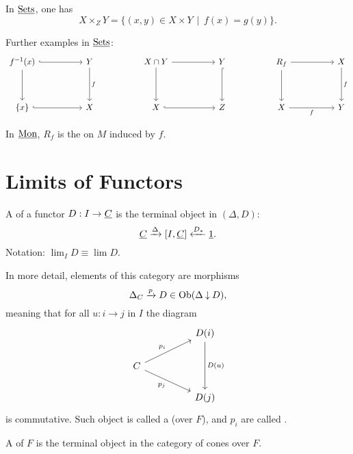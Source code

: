 \begin{examples*}
	\item In \( \underline{\mathrm{Sets}} \), one has
		\[
			X \times_Z Y = \{(x, y) \in X \times Y \,\mid\, f(x) = g(y)\}.
		\]
	\item Further examples in \( \underline{\mathrm{Sets}} \):
		\[
			\begin{tikzcd}[column sep = 9mm]
				{f^{-1}(x)} && Y && {X \cap Y} && Y && {R_f} && X \\
				\\
				{\{x\}} && X && X && Z && X && Y
				\arrow[hook, from=1-1, to=1-3]
				\arrow[from=1-1, to=3-1]
				\arrow["f", from=1-3, to=3-3]
				\arrow[from=1-5, to=1-7]
				\arrow[from=1-5, to=3-5]
				\arrow[hook, from=1-7, to=3-7]
				\arrow[from=1-9, to=1-11]
				\arrow[from=1-9, to=3-9]
				\arrow["f", from=1-11, to=3-11]
				\arrow[hook, from=3-1, to=3-3]
				\arrow[hook, from=3-5, to=3-7]
				\arrow["f"', from=3-9, to=3-11]
			\end{tikzcd}
		\]
	\item In \( \underline{\mathrm{Mon}} \), \( R_f \) is the  on \( M \) induced by \( f \).
\end{examples*}

\section{Limits of Functors}

\begin{definition*}
	A  of a functor \( D: I \to \underline{C} \) is the terminal object in \( (\Delta \comma D) \):
	\[
		\underline{C} \xrightarrow{\Delta} [I, \underline{C}] \xleftarrow{D_*} \underline{\mathrm{1}}.
	\]
	Notation: \( \lim_I D \equiv \lim D \).
\end{definition*}

In more detail, elements of this category are morphisms
\[
	\Delta_C \xrightarrow{p} D \in \operatorname{Ob}(\Delta \mathbin{\downarrow} D),
\]
meaning that for all \( u: i \to j \) in \( I \) the diagram
\[
	\begin{tikzcd}
		&& {D(i)} \\
		C \\
		&& {D(j)}
		\arrow["{D(u)}", from=1-3, to=3-3]
		\arrow["{p_i}", from=2-1, to=1-3]
		\arrow["{p_j}"', from=2-1, to=3-3]
	\end{tikzcd}
\]
is commutative. Such object is called a  (over \( F \)), and \( p_i \) are called .

\begin{definition*}[Alternative]
	A  of \( F \) is the terminal object in the category of cones over \( F \).
\end{definition*}


